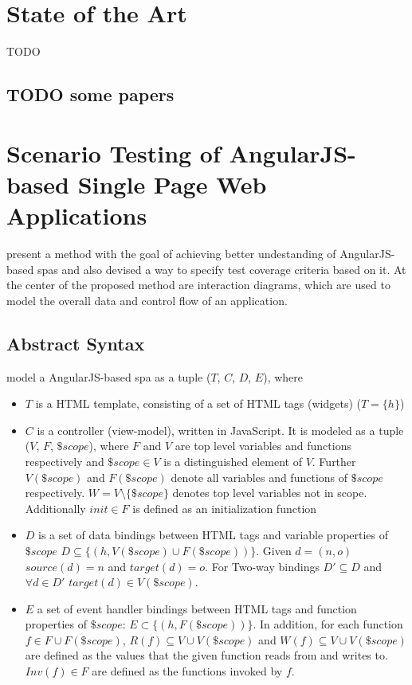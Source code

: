 \section{State of the Art}
TODO
\subsection{TODO some papers}

\section{Scenario Testing of AngularJS-based Single Page Web Applications}
\textcite{zhang2019scenario} present a method with the goal of achieving better undestanding of AngularJS-based \glspl{spa} and also devised a way to specify test coverage criteria based on it. At the center of the proposed method are interaction diagrams, which are used to model the overall data and control flow of an application.\parencite{zhang2019scenario}

\subsection{Abstract Syntax}
\textcite{zhang2019scenario} model a AngularJS-based \gls{spa} as a tuple ($T$, $C$, $D$, $E$), where

\begin{itemize}
  \item $T$ is a HTML template, consisting of a set of HTML tags (widgets) ($T = \{h\}$)
  \item 
  $C$ is a controller (view-model), written in JavaScript. It is modeled as a tuple ($V$, $F$, $\$scope$), where $F$ and $V$ are top level variables and functions respectively and $\$scope \in V$ is a distinguished element of $V$. Further $V(\$scope)$ and $F(\$scope)$ denote all variables and functions of $\$scope$ respectively. $W = V \setminus \{\$scope\}$ denotes top level variables not in scope. Additionally $init \in F$ is defined as an initialization function
  \item $D$ is a set of data bindings between HTML tags and variable properties of $\$scope$ $ D \subseteq \{(h,V(\$scope) \cup F(\$scope))\}$. Given $d = (n,o)$ $source(d) = n$ and $target(d) = o$. For Two-way bindings $D' \subseteq D$ and $\forall d \in D'$ $target(d) \in V(\$scope)$.
  \item $E$ a set of event handler bindings between HTML tags and function properties of $\$scope$: $E \subset \{(h,F(\$scope))\}$. In addition, for each function $f \in F \cup F(\$scope)$, $R(f) \subseteq V \cup V(\$scope)$ and $W(f) \subseteq V \cup V(\$scope)$ are defined as the values that the given function reads from and writes to. $Inv(f) \in F $ are defined as the functions invoked by $f$. \parencite{zhang2019scenario}
\end{itemize}
